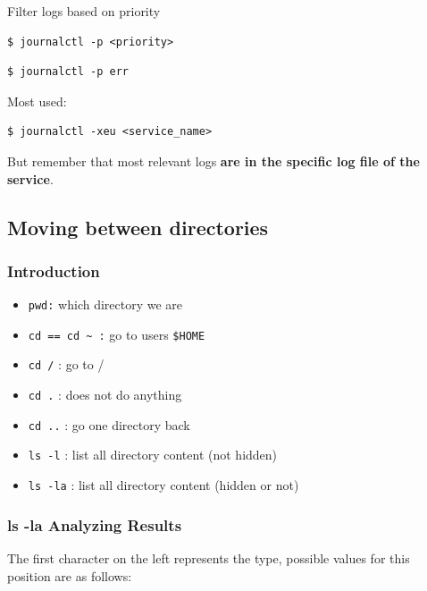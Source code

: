 \documentclass{article}
\newenvironment{blocktemplate}[1]{%
    \tcolorbox[beamer,%
    noparskip,breakable,
    colframe=Blue,%
    colbacklower=LimeGreen!75!LightGreen,%
    title=#1]}%
    {\endtcolorbox}
\newenvironment{codetemplate}[1][]{%
  \mybasecolorbox[#1]
  \itshape
}{%
  \endmybasecolorbox
}
\begin{document}
Filter logs based on priority
\begin{codetemplate}{}
\begin{verbatim}
$ journalctl -p <priority>
\end{verbatim}
\end{codetemplate}
\begin{codetemplate}{}
\begin{verbatim}
$ journalctl -p err
\end{verbatim}
\end{codetemplate}

\begin{blocktemplate}{Note}
Most used:
\begin{codetemplate}{}
\begin{verbatim}
$ journalctl -xeu <service_name>
\end{verbatim}
\end{codetemplate}

But remember that most relevant logs \textbf{are in the specific log file of the service}.
\end{blocktemplate}

\subsection{Moving between directories}
\subsubsection{Introduction}
\begin{itemize}
    \item \verb+pwd:+ which directory we are
    \item \verb+cd == cd ~ :+ go to users \verb+$HOME+
    \item \verb+cd /+ : go to /
    \item \verb+cd .+ : does not do anything
    \item \verb+cd ..+ : go one directory back
    \item \verb+ls -l+ : list all directory content (not hidden)
    \item \verb+ls -la+ : list all directory content (hidden or not)
\end{itemize}

\subsubsection{ls -la Analyzing Results}
The first character on the left represents the type, possible values for this position are as follows:
\end{document}
